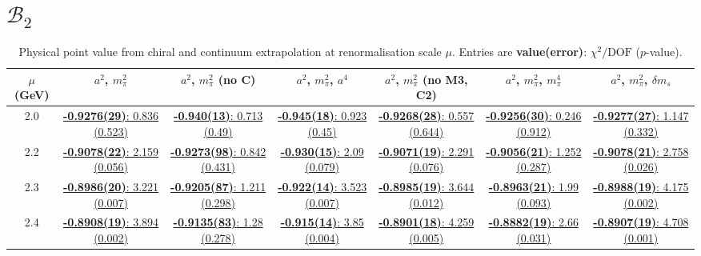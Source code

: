 \documentclass[12pt]{extarticle}
\begin{document}
\section{$\mathcal{B}_2$}
\begin{table}[h!]
\begin{center}
\begin{tabular}{|c|c|c|c|c|c|c|}
\hline
$\mu$ (GeV) & $a^2$, $m_\pi^2$& $a^2$, $m_\pi^2$ (no C)& $a^2$, $m_\pi^2$, $a^4$& $a^2$, $m_\pi^2$ (no M3, C2)& $a^2$, $m_\pi^2$, $m_\pi^4$& $a^2$, $m_\pi^2$, $\delta m_s$\\
\hline
2.0& \hyperlink{VVmAA/SUSY/bag_a2m2_20.pdf.1}{\textbf{-0.9276(29)}: 0.836 (0.523)} & \hyperlink{VVmAA/SUSY/bag_a2m2noC_20.pdf.1}{\textbf{-0.940(13)}: 0.713 (0.49)} & \hyperlink{VVmAA/SUSY/bag_a2a4m2_20.pdf.1}{\textbf{-0.945(18)}: 0.923 (0.45)} & \hyperlink{VVmAA/SUSY/bag_a2m2mcut_20.pdf.1}{\textbf{-0.9268(28)}: 0.557 (0.644)} & \hyperlink{VVmAA/SUSY/bag_a2m2m4_20.pdf.1}{\textbf{-0.9256(30)}: 0.246 (0.912)} & \hyperlink{VVmAA/SUSY/bag_a2m2delm_20.pdf.1}{\textbf{-0.9277(27)}: 1.147 (0.332)}\\
2.2& \hyperlink{VVmAA/SUSY/bag_a2m2_22.pdf.1}{\textbf{-0.9078(22)}: 2.159 (0.056)} & \hyperlink{VVmAA/SUSY/bag_a2m2noC_22.pdf.1}{\textbf{-0.9273(98)}: 0.842 (0.431)} & \hyperlink{VVmAA/SUSY/bag_a2a4m2_22.pdf.1}{\textbf{-0.930(15)}: 2.09 (0.079)} & \hyperlink{VVmAA/SUSY/bag_a2m2mcut_22.pdf.1}{\textbf{-0.9071(19)}: 2.291 (0.076)} & \hyperlink{VVmAA/SUSY/bag_a2m2m4_22.pdf.1}{\textbf{-0.9056(21)}: 1.252 (0.287)} & \hyperlink{VVmAA/SUSY/bag_a2m2delm_22.pdf.1}{\textbf{-0.9078(21)}: 2.758 (0.026)}\\
2.3& \hyperlink{VVmAA/SUSY/bag_a2m2_23.pdf.1}{\textbf{-0.8986(20)}: 3.221 (0.007)} & \hyperlink{VVmAA/SUSY/bag_a2m2noC_23.pdf.1}{\textbf{-0.9205(87)}: 1.211 (0.298)} & \hyperlink{VVmAA/SUSY/bag_a2a4m2_23.pdf.1}{\textbf{-0.922(14)}: 3.523 (0.007)} & \hyperlink{VVmAA/SUSY/bag_a2m2mcut_23.pdf.1}{\textbf{-0.8985(19)}: 3.644 (0.012)} & \hyperlink{VVmAA/SUSY/bag_a2m2m4_23.pdf.1}{\textbf{-0.8963(21)}: 1.99 (0.093)} & \hyperlink{VVmAA/SUSY/bag_a2m2delm_23.pdf.1}{\textbf{-0.8988(19)}: 4.175 (0.002)}\\
2.4& \hyperlink{VVmAA/SUSY/bag_a2m2_24.pdf.1}{\textbf{-0.8908(19)}: 3.894 (0.002)} & \hyperlink{VVmAA/SUSY/bag_a2m2noC_24.pdf.1}{\textbf{-0.9135(83)}: 1.28 (0.278)} & \hyperlink{VVmAA/SUSY/bag_a2a4m2_24.pdf.1}{\textbf{-0.915(14)}: 3.85 (0.004)} & \hyperlink{VVmAA/SUSY/bag_a2m2mcut_24.pdf.1}{\textbf{-0.8901(18)}: 4.259 (0.005)} & \hyperlink{VVmAA/SUSY/bag_a2m2m4_24.pdf.1}{\textbf{-0.8882(19)}: 2.66 (0.031)} & \hyperlink{VVmAA/SUSY/bag_a2m2delm_24.pdf.1}{\textbf{-0.8907(19)}: 4.708 (0.001)}\\
\hline
\end{tabular}
\caption{Physical point value from chiral and continuum extrapolation at renormalisation scale $\mu$. Entries are \textbf{value(error)}: $\chi^2/\text{DOF}$ ($p$-value).}
\end{center}
\end{table}
\end{document}
